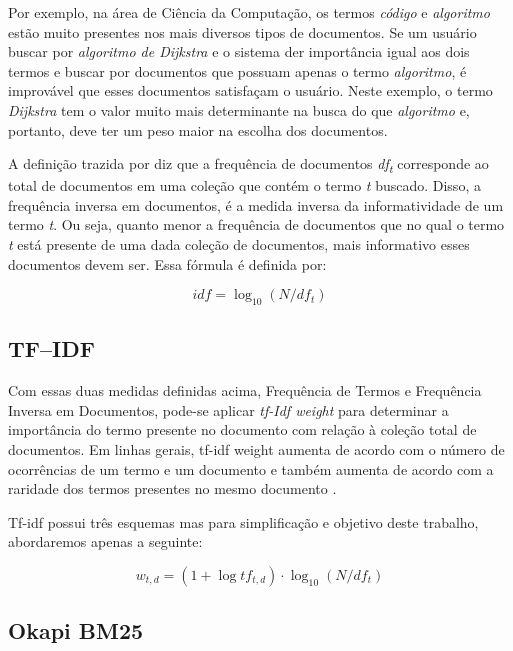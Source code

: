 Por exemplo, na área de Ciência da Computação, os termos \textit{código} e \textit{algoritmo} estão muito presentes nos mais diversos tipos de documentos. Se um usuário buscar por \textit{algoritmo de Dijkstra} e o sistema der importância igual aos dois termos e buscar por documentos que possuam apenas o termo \textit{algoritmo}, é improvável que esses documentos satisfaçam o usuário. Neste exemplo, o termo \textit{Dijkstra} tem o valor muito mais determinante na busca do que \textit{algoritmo} e, portanto, deve ter um peso maior na escolha dos documentos.

A definição trazida por \cite{Manning2008} diz que a frequência de documentos \textit{df\textsubscript{t}} corresponde ao total de documentos em uma coleção que contém o termo \textit{t} buscado. Disso, a frequência inversa em documentos, é a medida inversa da informatividade de um termo \textit{t}. Ou seja, quanto menor a frequência de documentos que no qual o termo \textit{t} está presente de uma dada coleção de documentos, mais informativo esses documentos devem ser. Essa fórmula é definida por:

\begin{equation}
idf = \log_{10}(N/df_{t})
\label{eq:idf}
\end{equation}

\subsection{TF–IDF}

Com essas duas medidas definidas acima, Frequência de Termos e Frequência Inversa em Documentos, pode-se aplicar \textit{tf-Idf weight} para determinar a importância do termo presente no documento com relação à coleção total de documentos. Em linhas gerais, tf-idf weight aumenta de acordo com o número de ocorrências de um termo e um documento e também aumenta de acordo com a raridade dos termos presentes no mesmo documento \cite{Manning2008}. 

Tf-idf possui três esquemas mas para simplificação e objetivo deste trabalho, abordaremos apenas a seguinte:
 
\begin{equation}
w_{t,d} = (1 + \log tf_{t,d}) \cdot \log_{10}(N/df_{t})
\label{eq:tf-idf}
\end{equation}

\subsection{Okapi BM25}

